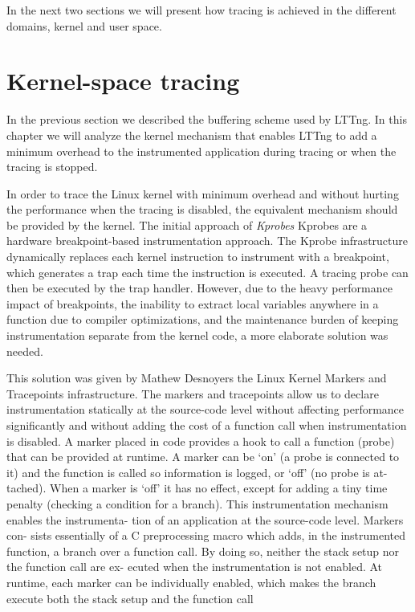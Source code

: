 In the next two sections we will present how tracing is achieved in the
different domains, kernel and user space.

\section{Kernel-space tracing}\label{sec:kernel-tracing}

In the previous section we described the buffering scheme used by LTTng. In this
chapter we will analyze the kernel mechanism that enables LTTng to add a minimum
overhead to the instrumented application during tracing or when the tracing is
stopped.

In order to trace the Linux kernel with minimum overhead and without hurting the
performance when the tracing is disabled, the equivalent mechanism should be
provided by the kernel. The initial approach of \textit{Kprobes}\cite{kprobes}
Kprobes are a hardware breakpoint-based instrumentation approach. The Kprobe
infrastructure dynamically replaces each kernel instruction to instrument with a
breakpoint, which generates a trap each time the instruction is executed. A
tracing probe can then be executed by the trap handler. However, due to the
heavy performance impact of breakpoints, the inability to extract local
variables anywhere in a function due to compiler optimizations, and the
maintenance burden of keeping instrumentation separate from the kernel code, a
more elaborate solution was needed.

This solution was given by Mathew Desnoyers the Linux Kernel Markers
\cite{kmarkers} and Tracepoints infrastructure. The markers and tracepoints
allow us to declare instrumentation statically at the source-code level without
affecting performance significantly and without adding the cost of a function
call when instrumentation is disabled. A marker placed in code provides a hook
to call a function (probe) that can be provided at runtime. A marker can be
`on' (a probe is connected to it) and the function is called so information is
logged, or `off' (no probe is at- tached). When a marker is `off' it has no
effect, except for adding a tiny time penalty (checking a condition for a
branch). This instrumentation mechanism enables the instrumenta- tion of an
application at the source-code level. Markers con- sists essentially of a C
preprocessing macro which adds, in the instrumented function, a branch over a
function call. By doing so, neither the stack setup nor the function call are
ex- ecuted when the instrumentation is not enabled. At runtime, each marker can
be individually enabled, which makes the branch execute both the stack setup
and the function call 

